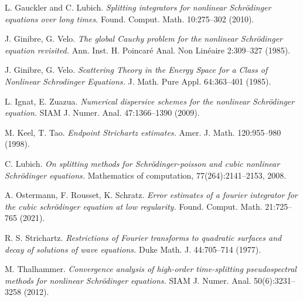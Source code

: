 \documentclass[10pt,a4paper]{article}
\begin{document}
\begin{thebibliography}{99}
      {\rm L. Gauckler and C. Lubich.}
      {\em Splitting integrators for nonlinear Schrödinger equations over long times.}
      Found. Comput. Math. 10:275--302 (2010).

      {\rm J. Ginibre, G. Velo.}
      {\em The global Cauchy problem for the nonlinear Schr\"odinger equation revisited.}
      Ann. Inst. H. Poincar\'e Anal. Non Lin\'eaire 2:309--327 (1985).

      {\rm J. Ginibre, G. Velo.}
      {\em Scattering Theory in the Energy Space for a Class of Nonlinear Schrodinger Equations.}
      J. Math. Pure Appl. 64:363--401 (1985).

      {\rm L. Ignat, E. Zuazua.}
      {\em Numerical dispersive schemes for the nonlinear Schr\"odinger equation.}
      SIAM J. Numer. Anal. 47:1366--1390 (2009).

      {\rm M. Keel, T. Tao.}
      {\em Endpoint Strichartz estimates.}
      Amer. J. Math. 120:955--980 (1998).

      {\rm C. Lubich.}
      {\em On splitting methods for Schr\"odinger-poisson and cubic nonlinear Schr\"odinger equations.}
      Mathematics of computation, 77(264):2141--2153, 2008.

      {\rm A. Ostermann, F. Rousset, K. Schratz.}
      {\em Error estimates of a fourier integrator for the cubic schr\"odinger equation at low regularity.}
      Found. Comput. Math. 21:725--765 (2021).

      {\rm R. S. Strichartz.}
      {\em Restrictions of Fourier transforms to quadratic surfaces and decay of solutions of wave equations.}
      Duke Math. J. 44:705--714 (1977).

      {\rm M. Thalhammer.}
      {\em Convergence analysis of high-order time-splitting pseudospectral methods for nonlinear Schr\"odinger equations.}
      SIAM J. Numer. Anal. 50(6):3231--3258 (2012).

  \end{thebibliography}
\end{document}
